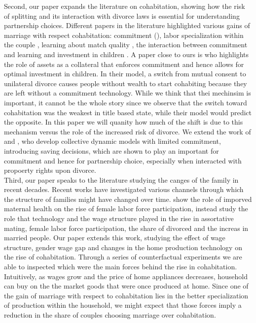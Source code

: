 \documentclass[12pt]{article}
\numberwithin{table}{section}
\begin{document}
Second, our paper expands the literature on cohabitation, showing how the risk of splitting and its interaction with divorce laws is essential for understanding partnership choices. Different papers in the literature highlighted various gains of marriage with respect cohabitation: commitment (\cite{matouschek2008}), labor specialization within the couple \cite{gemici2014}, learning about match quality \cite{brien2006}, the interaction between commitment and learning \cite{blasutto2020} and  investment in children \cite{lafortune2019}. A paper close to ours is \cite{lafortune2019} who highlights the role of assets as a collateral that enforces commitment and hence allows for optimal investment in children. In their model, a switch from mutual consent to unilateral divorce causes people without wealth to start cohabiting because they are left without a commitment technology. While we think that thei mechinsim is important, it cannot be the whole story since we observe that the switch toward cohabitation was the weakest in title based state, while their model would predict the opposite. In this paper we will quanity how much of the shift is due to this mechanism versus the role of the increased risk of divorce. We extend the work of \cite{gemici2014} and \cite{blasutto2020}, who develop collective dynamic models with limited commitment, introducing saving decisions, which are shown to play an important for commitment and hence for partnership choice, especially when interacted with propoerty rights upon divorce.\\
Third, our paper speaks to the literature studying the canges of the family in recent decades. Recent works have investigated various channels through which the structure of families might have changed over time. \cite{albanesi2009} show the role of imporved maternal health on the rise of female labor force participation, \cite{greenwood2016} instead study the role that technology and the wage structure played in the rise in assortative mating, female labor force participation, the share of divorced and the increas in married people. Our paper extends this work, studying the effect of wage structure, gender wage gap and changes in the home production technology on the rise of cohabitation. Through a series of counterfactual experiments we are able to inspected which were the main forces behind the rise in cohabitation. Intuitively, as wages grow and the price of home appliances decreases, household can buy on the the market goods that were once produced at home. Since one of the gain of marriage with respect to cohabitation lies in the better specialization of production within the household, we might expect that those forces imply a reduction in the share of couples choosing marriage over cohabitation.
\end{document}
